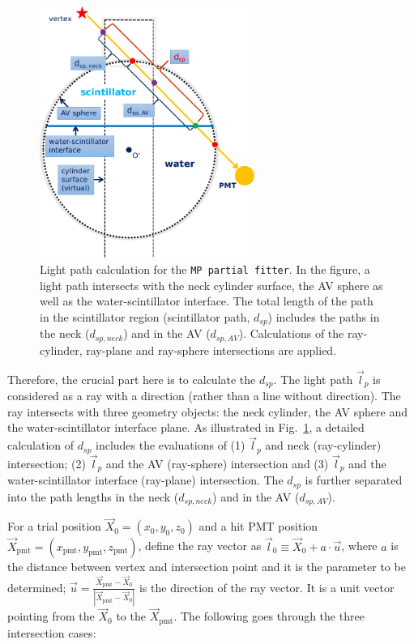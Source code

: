 \begin{figure}[!htb]
	\centering
	\includegraphics[width=7cm]{scintpath.png}
	\caption{Light path calculation for the \texttt{MP partial fitter}. In the figure, a light path intersects with the neck cylinder surface, the AV sphere as well as the water-scintillator interface. The total length of the path in the scintillator region (scintillator path, $d_{sp}$) includes the paths in the neck ($d_{sp,neck}$) and in the AV ($d_{sp,AV}$). Calculations of the ray-cylinder, ray-plane and ray-sphere intersections are applied.}
	\label{fig:scintpath}
\end{figure}

Therefore, the crucial part here is to calculate the $d_{sp}$. The light path $\vec{l}_p$ is considered as a ray with a direction (rather than a line without direction). The ray intersects with three geometry objects: the neck cylinder, the AV sphere and the water-scintillator interface plane. As illustrated in Fig.~\ref{fig:scintpath}, a detailed calculation of $d_{sp}$ includes the evaluations of (1) $\vec{l}_p$ and neck (ray-cylinder) intersection; (2) $\vec{l}_p$ and the AV (ray-sphere) intersection and (3) $\vec{l}_p$ and the water-scintillator interface (ray-plane) intersection. The $d_{sp}$ is further separated into the path lengths in the neck ($d_{sp,neck}$) and in the AV ($d_{sp,AV}$). 

For a trial position $\vec{X}_0=(x_0,y_0,z_0)$ and a hit PMT position $\vec{X}_{\mathrm{pmt}}=(x_\mathrm{pmt},y_\mathrm{pmt},z_\mathrm{pmt})$, define the ray vector as $\vec{l}_0\equiv\vec{X}_0+a\cdot \vec{u}$, where $a$ is the distance between vertex and intersection point and it is the parameter to be determined; $\vec u=\frac{\vec{X}_{\mathrm{pmt}}-\vec{X}_0}{|\vec{X}_{\mathrm{pmt}}-\vec{X}_0|}$ is the direction of the ray vector. It is a unit vector pointing from the $\vec{X}_0$ to the $\vec{X}_{\mathrm{pmt}}$. The following goes through the three intersection cases:

